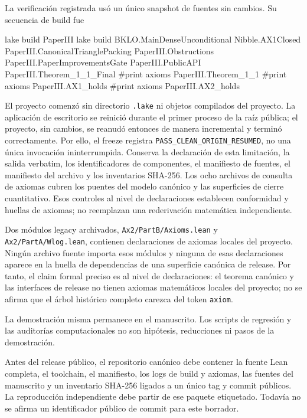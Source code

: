 \documentclass[
  spanish,
  11pt,
  a4paper,
]{article}
\newenvironment{Shaded}{}{}
\newcommand{\NormalTok}[1]{#1}
\begin{document}
La verificación registrada usó un único snapshot de fuentes sin cambios. Su secuencia de build fue

\begin{Shaded}
\begin{Highlighting}[]
\NormalTok{lake build PaperIII}
\NormalTok{lake build BKLO.MainDenseUnconditional Nibble.AX1Closed PaperIII.CanonicalTrianglePacking PaperIII.Obstructions PaperIII.PaperImprovementsGate PaperIII.PublicAPI PaperIII.Theorem\_1\_1\_Final}
\NormalTok{\#print axioms PaperIII.Theorem\_1\_1}
\NormalTok{\#print axioms PaperIII.AX1\_holds}
\NormalTok{\#print axioms PaperIII.AX2\_holds}
\end{Highlighting}
\end{Shaded}

El proyecto comenzó sin directorio \texttt{.lake} ni objetos compilados del proyecto. La aplicación de escritorio se reinició durante el primer proceso de la raíz pública; el proyecto, sin cambios, se reanudó entonces de manera incremental y terminó correctamente. Por ello, el freeze registra \texttt{PASS\_CLEAN\_ORIGIN\_RESUMED}, no una única invocación ininterrumpida. Conserva la declaración de esta limitación, la salida verbatim, los identificadores de componentes, el manifiesto de fuentes, el manifiesto del archivo y los inventarios SHA-256. Los ocho archivos de consulta de axiomas cubren los puentes del modelo canónico y las superficies de cierre cuantitativo. Esos controles al nivel de declaraciones establecen conformidad y huellas de axiomas; no reemplazan una rederivación matemática independiente.

Dos módulos legacy archivados, \texttt{Ax2/PartB/Axioms.lean} y \texttt{Ax2/PartA/Wlog.lean}, contienen declaraciones de axiomas locales del proyecto. Ningún archivo fuente importa esos módulos y ninguna de esas declaraciones aparece en la huella de dependencias de una superficie canónica de release. Por tanto, el claim formal preciso es al nivel de declaraciones: el teorema canónico y las interfaces de release no tienen axiomas matemáticos locales del proyecto; no se afirma que el árbol histórico completo carezca del token \texttt{axiom}.

La demostración misma permanece en el manuscrito. Los scripts de regresión y las auditorías computacionales no son hipótesis, reducciones ni pasos de la demostración.

Antes del release público, el repositorio canónico debe contener la fuente Lean completa, el toolchain, el manifiesto, los logs de build y axiomas, las fuentes del manuscrito y un inventario SHA-256 ligados a un único tag y commit públicos. La reproducción independiente debe partir de ese paquete etiquetado. Todavía no se afirma un identificador público de commit para este borrador.
\end{document}
